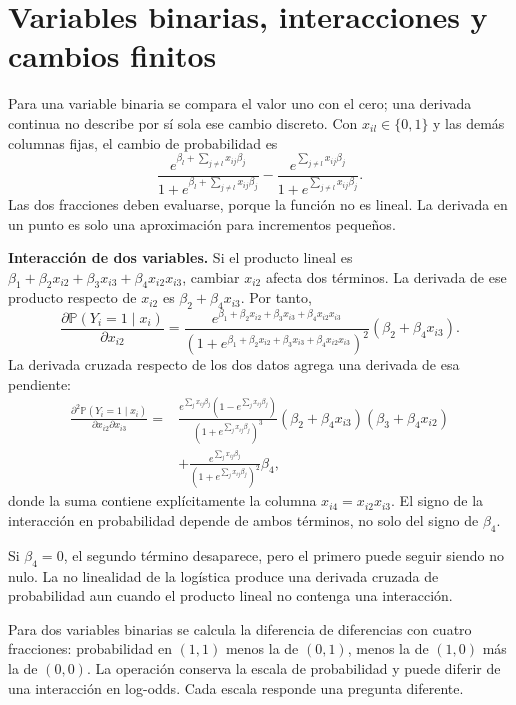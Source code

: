 \documentclass[11pt,a4paper]{article}
\newcommand{\Prob}{\mathbb P}
\begin{document}
\clearpage
\section{Variables binarias, interacciones y cambios finitos}\label{logit63}
Para una variable binaria se compara el valor uno con
el cero; una derivada continua no describe por sí sola
ese cambio discreto.
Con $x_{il}\in\{0,1\}$ y las demás columnas fijas,
el cambio de probabilidad es
\[
\frac{e^{\beta_l+\sum_{j\ne l}x_{ij}\beta_j}}
{1+e^{\beta_l+\sum_{j\ne l}x_{ij}\beta_j}}
-
\frac{e^{\sum_{j\ne l}x_{ij}\beta_j}}
{1+e^{\sum_{j\ne l}x_{ij}\beta_j}}.
\]
Las dos fracciones deben evaluarse, porque la función
no es lineal. La derivada en un punto es solo una
aproximación para incrementos pequeños.

\textbf{Interacción de dos variables.}
Si el producto lineal es
$\beta_1+\beta_2x_{i2}+\beta_3x_{i3}
+\beta_4x_{i2}x_{i3}$, cambiar $x_{i2}$ afecta dos términos.
La derivada de ese producto respecto de $x_{i2}$ es
$\beta_2+\beta_4x_{i3}$.
Por tanto,
\[
\frac{\partial\Prob(Y_i=1\mid x_i)}{\partial x_{i2}}
=
\frac{e^{\beta_1+\beta_2x_{i2}+\beta_3x_{i3}+\beta_4x_{i2}x_{i3}}}
{(1+e^{\beta_1+\beta_2x_{i2}+\beta_3x_{i3}+\beta_4x_{i2}x_{i3}})^2}
(\beta_2+\beta_4x_{i3}).
\]
La derivada cruzada respecto de los dos datos agrega
una derivada de esa pendiente:
\[
\begin{aligned}
\frac{\partial^2\Prob(Y_i=1\mid x_i)}{\partial x_{i2}\partial x_{i3}}
={}&
\frac{e^{\sum_jx_{ij}\beta_j}(1-e^{\sum_jx_{ij}\beta_j})}
{(1+e^{\sum_jx_{ij}\beta_j})^3}
(\beta_2+\beta_4x_{i3})(\beta_3+\beta_4x_{i2})\\
&+\frac{e^{\sum_jx_{ij}\beta_j}}
{(1+e^{\sum_jx_{ij}\beta_j})^2}\beta_4,
\end{aligned}
\]
donde la suma contiene explícitamente la columna
$x_{i4}=x_{i2}x_{i3}$.
El signo de la interacción en probabilidad depende de
ambos términos, no solo del signo de $\beta_4$.

\begin{ejemplo}
Si $\beta_4=0$, el segundo término desaparece, pero
el primero puede seguir siendo no nulo.
La no linealidad de la logística produce una derivada
cruzada de probabilidad aun cuando el producto lineal
no contenga una interacción.
\end{ejemplo}
Para dos variables binarias se calcula la diferencia
de diferencias con cuatro fracciones:
probabilidad en $(1,1)$ menos la de $(0,1)$,
menos la de $(1,0)$ más la de $(0,0)$.
La operación conserva la escala de probabilidad y
puede diferir de una interacción en log-odds.
Cada escala responde una pregunta diferente.
\end{document}

